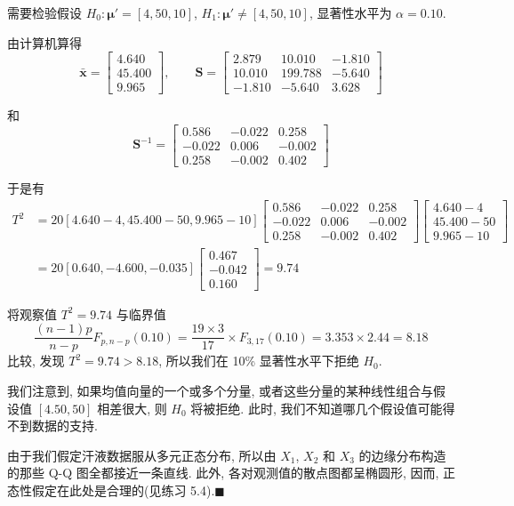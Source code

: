 需要检验假设 $H_0: \boldsymbol{\mu}'=[4,50,10]$, $H_1: \boldsymbol{\mu}'\neq[4,50,10]$, 显著性水平为 $\alpha=0.10$.

由计算机算得
\[
\bar{\mathbf{x}}=\begin{bmatrix}4.640\\45.400\\9.965\end{bmatrix},\qquad \mathbf{S}=\begin{bmatrix}2.879&10.010&-1.810\\10.010&199.788&-5.640\\-1.810&-5.640&3.628\end{bmatrix}
\]

和
\[
\mathbf{S}^{-1}=\begin{bmatrix}0.586&-0.022&0.258\\-0.022&0.006&-0.002\\0.258&-0.002&0.402\end{bmatrix}
\]

于是有
\begin{align*}
T^2&=20[4.640-4,45.400-50,9.965-10]\begin{bmatrix}0.586&-0.022&0.258\\-0.022&0.006&-0.002\\0.258&-0.002&0.402\end{bmatrix}\begin{bmatrix}4.640-4\\45.400-50\\9.965-10\end{bmatrix}\\
&=20[0.640,-4.600,-0.035]\begin{bmatrix}0.467\\-0.042\\0.160\end{bmatrix}=9.74
\end{align*}

将观察值 $T^2=9.74$ 与临界值
\[
\frac{(n-1)p}{n-p}F_{p,n-p}(0.10)=\frac{19\times 3}{17}\times F_{3,17}(0.10)=3.353\times 2.44=8.18
\]
比较, 发现 $T^2=9.74>8.18$, 所以我们在 10\% 显著性水平下拒绝 $H_0$.

我们注意到, 如果均值向量的一个或多个分量, 或者这些分量的某种线性组合与假设值 $[4.50,50]$ 相差很大, 则 $H_0$ 将被拒绝. 此时, 我们不知道哪几个假设值可能得不到数据的支持.

由于我们假定汗液数据服从多元正态分布, 所以由 $X_1$, $X_2$ 和 $X_3$ 的边缘分布构造的那些 Q-Q 图全都接近一条直线. 此外, 各对观测值的散点图都呈椭圆形, 因而, 正态性假定在此处是合理的(见练习 5.4).\hfill$\blacksquare$

